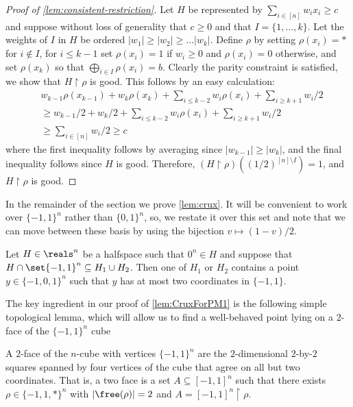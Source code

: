 \documentclass{toc}
\begin{document}
\begin{proof}[Proof of \autoref{lem:consistent-restriction}]
	Let $H$ be represented by $\sum_{i \in [n]} w_i x_i \geq c$ and suppose without loss of generality that $c \geq 0$ and that $I = \{1, \ldots, k\}$. 
	Let the weights of $I$ in $H$ be ordered $|w_1| \geq |w_2| \geq \ldots |w_k|$. 
	Define $\rho$ by setting $\rho(x_i) = *$ for $i \not \in I$, for $i \leq k-1$ set $\rho(x_i) = 1$ if $w_i \geq 0$ and $\rho(x_i) = 0$ otherwise, and set $\rho(x_k)$ so that $\bigoplus_{i \in I} \rho(x_i) = b$. 
	Clearly the parity constraint is satisfied, we show that $H \restriction \rho$ is good.
	This follows by an easy calculation:
	\begin{align*} 
		 &w_{k-1}\rho(x_{k-1}) + w_k\rho(x_k) + \sum_{i \leq k-2} w_i \rho(x_i) + \sum_{i \geq k+1} w_i/2 \\
			&\geq w_{k-1}/2 + w_k/2 + \sum_{i \leq k-2} w_i \rho(x_i) + \sum_{i \geq k+1} w_i/2 	\\
			&\geq \sum_{i \in [n]} w_i/2 \geq c 
	\end{align*}
	where the first inequality follows by averaging since $|w_{k-1}| \geq |w_{k}|$, and the final inequality follows since $H$ is good. Therefore, $(H \restriction \rho)((1/2)^{[n]\setminus I}) =1 $, and $H \restriction \rho$ is good.
\end{proof}


In the remainder of the section we prove \autoref{lem:crux}.
It will be convenient to work over $\{-1,1\}^n$ rather than $\{0,1\}^n$, so, we restate it over this set and note that we can move between these basis by using the bijection $v \mapsto (1-v)/2$.

\begin{lemma}\label{lem:CruxForPM1}
	Let $H \in \reals^n$ be a halfspace such that $0^n \in H$ and suppose that $H \cap \set{-1,1}^n \subseteq H_1 \cup H_2$. 
	Then one of $H_1$ or $H_2$ contains a point $y \in \{-1,0,1\}^n$ such that $y$ has at most two coordinates in $\{-1,1\}$. 
\end{lemma}

The key ingredient in our proof of \autoref{lem:CruxForPM1} is the following simple topological lemma, which will allow us to find a well-behaved point lying on a $2$-face of the $\{-1,1\}^n$ cube

\begin{definition}[$2$-face]
	A $2$-face of the $n$-cube with vertices $\{-1,1\}^n$ are the $2$-dimensional $2$-by-$2$ squares spanned by four vertices of the cube that agree on all but two coordinates. 
%
That is, a two face is a set $A \subseteq [-1,1]^n$ such that there exists $\rho \in \{-1,1,*\}^n$ with $|\free(\rho)| = 2$ and $A = [-1,1]^n \restriction \rho$.
\end{definition}
\end{document}
